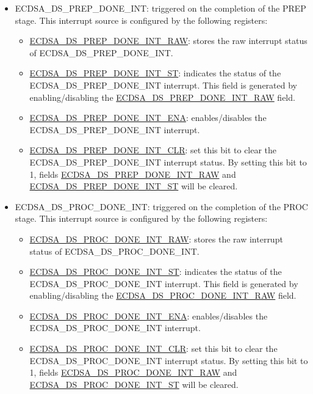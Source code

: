 \documentclass[main\_\_EN.tex]{subfiles}
\begin{document}
\begin{itemize}
	\item \label{int:ECDSADSPREPDONEINT}ECDSA\_DS\_PREP\_DONE\_INT: triggered on the completion of the PREP stage. This interrupt source is configured by the following registers:
	      \begin{itemize}
		      \item \hyperref[fielddesc:ECDSADSPREPDONEINTRAW]{ECDSA\_DS\_PREP\_DONE\_INT\_RAW}: stores the raw interrupt status of ECDSA\_DS\_PREP\_DONE\_INT.
		      \item \hyperref[fielddesc:ECDSADSPREPDONEINTST]{ECDSA\_DS\_PREP\_DONE\_INT\_ST}: indicates the status of the ECDSA\_DS\_PREP\_DONE\_INT interrupt. This field is generated by enabling/disabling the \hyperref[fielddesc:ECDSADSPREPDONEINTRAW]{ECDSA\_DS\_PREP\_DONE\_INT\_RAW} field.
		      \item \hyperref[fielddesc:ECDSADSPREPDONEINTENA]{ECDSA\_DS\_PREP\_DONE\_INT\_ENA}: enables/disables the ECDSA\_DS\_PREP\_DONE\_INT interrupt.
		      \item \hyperref[fielddesc:ECDSADSPREPDONEINTCLR]{ECDSA\_DS\_PREP\_DONE\_INT\_CLR}: set this bit to clear the ECDSA\_DS\_PREP\_DONE\_INT interrupt status. By setting this bit to 1, fields \hyperref[fielddesc:ECDSADSPREPDONEINTRAW]{ECDSA\_DS\_PREP\_DONE\_INT\_RAW} and  \hyperref[fielddesc:ECDSADSPREPDONEINTST]{ECDSA\_DS\_PREP\_DONE\_INT\_ST} will be cleared.
	      \end{itemize}
	\item \label{int:ECDSADSPROCDONEINT}ECDSA\_DS\_PROC\_DONE\_INT: triggered on the completion of the PROC stage. This interrupt source is configured by the following registers:
	      \begin{itemize}
		      \item \hyperref[fielddesc:ECDSADSPROCDONEINTRAW]{ECDSA\_DS\_PROC\_DONE\_INT\_RAW}: stores the raw interrupt status of ECDSA\_DS\_PROC\_DONE\_INT.
		      \item \hyperref[fielddesc:ECDSADSPROCDONEINTST]{ECDSA\_DS\_PROC\_DONE\_INT\_ST}: indicates the status of the ECDSA\_DS\_PROC\_DONE\_INT interrupt. This field is generated by enabling/disabling the \hyperref[fielddesc:ECDSADSPROCDONEINTRAW]{ECDSA\_DS\_PROC\_DONE\_INT\_RAW} field.
		      \item \hyperref[fielddesc:ECDSADSPROCDONEINTENA]{ECDSA\_DS\_PROC\_DONE\_INT\_ENA}: enables/disables the ECDSA\_DS\_PROC\_DONE\_INT interrupt.
		      \item \hyperref[fielddesc:ECDSADSPROCDONEINTCLR]{ECDSA\_DS\_PROC\_DONE\_INT\_CLR}: set this bit to clear the ECDSA\_DS\_PROC\_DONE\_INT interrupt status. By setting this bit to 1, fields \hyperref[fielddesc:ECDSADSPROCDONEINTRAW]{ECDSA\_DS\_PROC\_DONE\_INT\_RAW} and  \hyperref[fielddesc:ECDSADSPROCDONEINTST]{ECDSA\_DS\_PROC\_DONE\_INT\_ST} will be cleared.

\end{itemize}
\end{itemize}
\end{document}
